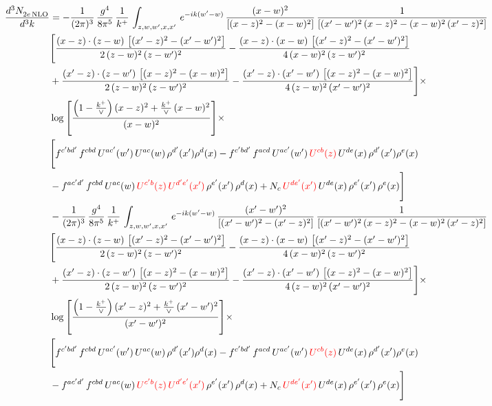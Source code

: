 \documentclass[9pt]{article}
\numberwithin{equation}{section}
\begin{document}
\begin{align}
 \frac{d^{3}N_{2e\,\rm NLO}^{\rm}}{d^{3}k}  & =   -\frac{1}{(2\pi)^{3}}\, \frac{g^{4}}{8\pi^{5}}\,\frac{1}{k^{+}}\,\int_{z,w,w^{\prime},x,x'}\, e^{-ik(w^{\prime}-w)}\,\frac{(x-w)^{2}}{\left[(x-z)^{2}-(x-w)^{2}\right]}\, \frac{1}{\left[(x'-w')^{2}\, (x-z)^{2} - (x-w)^{2}\, (x'-z)^{2}\right]} \notag \\ & \Bigg[\frac{(x-z)\cdot (z-w)\, \left[(x'-z)^{2}-(x'-w')^{2}\right]}{2\, (z-w)^{2}\, (z-w')^{2}}  - \frac{(x-z)\cdot (x-w)\,\left[(x'-z)^{2}-(x'-w')^{2}\right] }{4\,(x-w)^{2}\,(z-w')^{2}}\notag \\ & +\frac{(x'-z)\cdot (z-w')\, \left[(x-z)^{2}-(x-w)^{2}\right]}{2\, (z-w)^{2}\, (z-w')^{2}}-\frac{(x'-z)\cdot (x'-w')\, \left[(x-z)^{2}-(x-w)^{2}\right]}{4\, (z-w)^{2}\,(x'-w')^{2}}\Bigg]\times\,\notag \\ & \log{\left[\frac{\left(1-\frac{k^{+}}{\vee}\right)(x-z)^{2}+\frac{k^{+}}{\vee}\,(x-w)^{2}}{(x-w)^{2}}\right]}\times\,\notag \\ & \Bigg[f^{c'bd'}\,f^{cbd}\, U^{ac'}(w')\,U^{ac}(w)\,\rho^{d'}(x')\rho^{d}(x)- f^{c'bd'}\,f^{acd}\,U^{ac'}(w')\,{\color{red}U^{cb}(z)}\,U^{de}(x)\,\rho^{d'}(x')\rho^{e}(x) \notag \\ & -f^{ac'd'}\,f^{cbd}\,U^{ac}(w)\,{\color{red}U^{c'b}(z)\,U^{d'e'}(x')}\,\rho^{e'}(x')\,\rho^{d}(x) +N_{c}\,{\color{red}U^{de'}(x')}\,U^{de}(x)\,\rho^{e'}(x')\,\rho^{e}(x)\Bigg] \notag \\
& -\frac{1}{(2\pi)^{3}}\, \frac{g^{4}}{8\pi^{5}}\,\frac{1}{k^{+}}\,\int_{z,w,w^{\prime},x,x'}\, e^{-ik(w^{\prime}-w)}\, \frac{(x'-w')^{2}}{\left[(x'-w')^{2}-(x'-z)^{2}\right]}\, \frac{1}{\left[(x'-w')^{2}\, (x-z)^{2} - (x-w)^{2}\, (x'-z)^{2}\right]}  \notag \\ & \Bigg[\frac{(x-z)\cdot (z-w)\, \left[(x'-z)^{2}-(x'-w')^{2}\right]}{2\, (z-w)^{2}\, (z-w')^{2}}  - \frac{(x-z)\cdot (x-w)\,\left[(x'-z)^{2}-(x'-w')^{2}\right] }{4\,(x-w)^{2}\,(z-w')^{2}}\notag \\ & +\frac{(x'-z)\cdot (z-w')\, \left[(x-z)^{2}-(x-w)^{2}\right]}{2\, (z-w)^{2}\, (z-w')^{2}}-\frac{(x'-z)\cdot (x'-w')\, \left[(x-z)^{2}-(x-w)^{2}\right]}{4\, (z-w)^{2}\,(x'-w')^{2}}\Bigg]\times\,\notag \\ & \log{\left[\frac{\left(1-\frac{k^{+}}{\vee}\right)(x'-z)^{2}+\frac{k^{+}}{\vee}\,(x'-w')^{2}}{(x'-w')^{2}}\right]}\times\notag \\ & \Bigg[f^{c'bd'}\,f^{cbd}\, U^{ac'}(w')\,U^{ac}(w)\,\rho^{d'}(x')\rho^{d}(x)- f^{c'bd'}\,f^{acd}\,U^{ac'}(w')\,{\color{red}U^{cb}(z)}\,U^{de}(x)\,\rho^{d'}(x')\rho^{e}(x) \notag \\ & -f^{ac'd'}\,f^{cbd}\,U^{ac}(w)\,{\color{red}U^{c'b}(z)\,U^{d'e'}(x')}\,\rho^{e'}(x')\,\rho^{d}(x) +N_{c}\,{\color{red}U^{de'}(x')}\,U^{de}(x)\,\rho^{e'}(x')\,\rho^{e}(x)\Bigg]
\end{align}
\end{document}
